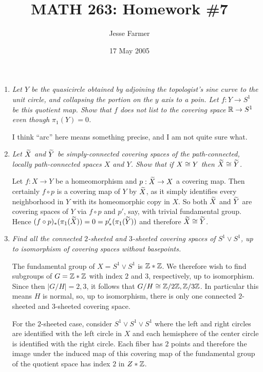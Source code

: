 \documentclass[10pt]{article}
\title{MATH 263: Homework \#7}
\author{Jesse Farmer}
\date{17 May 2005}
\begin{document}
\maketitle
\begin{enumerate}
\item \emph{Let $Y$ be the quasicircle obtained by adjoining the topologist's sine curve to the unit circle, and collapsing the portion on the $y$ axis to a poin.  Let $f: Y \rightarrow S^1$ be this quotient map.  Show that $f$ does not list to the covering space $\mathbb{R} \rightarrow S^1$ even though $\pi_1(Y) = 0$.}

I think ``arc'' here means something precise, and I am not quite sure what.

\item \emph{Let $\widetilde{X}$ and $\widetilde{Y}$ be simply-connected covering spaces of the path-connected, locally path-connected spaces $X$ and $Y$.  Show that if $X \cong Y$ then $\widetilde{X} \cong \widetilde{Y}$.}

Let $f: X \rightarrow Y$ be a homeomorphism and $p: \widetilde{X} \rightarrow X$ a covering map.  Then certainly $f \circ p$ is a covering map of $Y$ by $\widetilde{X}$, as it simply identifies every neighborhood in $Y$ with its homeomorphic copy in $X$.  So both $\widetilde{X}$ and $\widetilde{Y}$ are covering spaces of $Y$ via $f \circ p$ and $p'$, say, with trivial fundamental group.  Hence $(f \circ p)_\ast(\pi_1(\widetilde{X})) = 0 = p'_\ast(\pi_1(\widetilde{Y}))$ and therefore $\widetilde{X} \cong \widetilde{Y}$.

\item \emph{Find all the connected $2$-sheeted and $3$-sheeted covering spaces of $S^1 \vee S^1$, up to isomorphism of covering spaces without basepoints.}

The fundamental group of $X = S^1 \vee S^1$ is $\mathbb{Z} \ast \mathbb{Z}$.  We therefore wish to find subgroups of $G = \mathbb{Z} \ast \mathbb{Z}$ with index $2$ and $3$, respectively, up to isomorphism.  Since then $|G/H| = 2,3$, it follows that $G/H \cong \mathbb{Z}/2\mathbb{Z}, \mathbb{Z}/3\mathbb{Z}$.  In particular this means $H$ is normal, so, up to isomorphism, there is only one connected $2$-sheeted and $3$-sheeted covering space.

For the $2$-sheeted case, consider $S^1 \vee S^1 \vee S^1$ where the left and right circles are identified with the left circle in $X$ and each hemisphere of the center circle is identified with the right circle.  Each fiber has $2$ points and therefore the image under the induced map of this covering map of the fundamental group of the quotient space has index $2$ in $Z \ast \mathbb{Z}$.


\end{enumerate}
\end{document}
